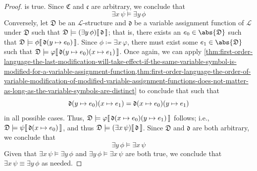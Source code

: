 \begin{proof}
    is true. Since \( \mathfrak{C} \) and \( \mathfrak{c} \) are arbitrary, we conclude that
    \begin{equation*}
        \exists x \, \psi \models \exists y \, \phi
    \end{equation*}
    Conversely, let \( \mathfrak{D} \) be an \( \mathcal{L} \)-structure and \( \mathfrak{d} \) be a variable assignment function of \( \mathcal{L} \) under \( \mathfrak{D} \)
    such that \( \folwffsatisfaction{\mathfrak{D}}{ \mleft( \exists y \, \phi \mright) }{\mathfrak{d}} \); that is, there exists an \( e_{0} \in \abs{\mathfrak{D}} \) such
    that \( \folwffsatisfaction{\mathfrak{D}}{\phi}{ \folmodifiedvariableassignmentfunction{\mathfrak{d}}{y}{e_{0}} } \).
    Since \( \phi \coloneq \exists x \, \varphi \), there must exist some \( e_{1} \in \abs{\mathfrak{D}} \)
    such that \( \folwffsatisfaction{\mathfrak{D}}{\varphi}{ \folmodifiedvariableassignmentfunction{ \folmodifiedvariableassignmentfunction{\mathfrak{d}}{y}{e_{0}} }{x}{e_{1}} } \).
    Once again, we can apply \cref{thm:first-order-language-the-last-modification-will-take-effect-if-the-same-variable-symbol-is-modified-for-a-variable-assignment-function,thm:first-order-language-the-order-of-variable-modification-of-modified-variable-assignment-functions-does-not-matter-as-long-as-the-variable-symbols-are-distinct} to conclude that
    such that
    \begin{equation*}
        \folmodifiedvariableassignmentfunction{ \folmodifiedvariableassignmentfunction{\mathfrak{d}}{y}{e_{0}} }{x}{e_{1}}
        = \folmodifiedvariableassignmentfunction{ \folmodifiedvariableassignmentfunction{\mathfrak{d}}{x}{e_{0}} }{y}{e_{1}}
    \end{equation*}
    in all possible cases. Thus, \( \folwffsatisfaction{\mathfrak{D}}{\varphi}{ \folmodifiedvariableassignmentfunction{ \folmodifiedvariableassignmentfunction{\mathfrak{d}}{x}{e_{0}} }{y}{e_{1}} } \) follows; i.e., \( \folwffsatisfaction{\mathfrak{D}}{\psi}{ \folmodifiedvariableassignmentfunction{\mathfrak{d}}{x}{e_{0}} } \), and thus
    \( \folwffsatisfaction{\mathfrak{D}}{\mleft( \exists x \, \psi \mright)}{\mathfrak{d}} \).
    Since \( \mathfrak{D} \) and \( \mathfrak{d} \) are both arbitrary, we conclude that
    \begin{equation*}
        \exists y \, \phi \models \exists x \, \psi
    \end{equation*}
    Given that \( \exists x \, \psi \models \exists y \, \phi \) and \( \exists y \, \phi \models \exists x \, \psi \) are both true, we conclude
    that \( \exists x \, \psi \equiv \exists y \, \phi \) as needed.
\end{proof}

